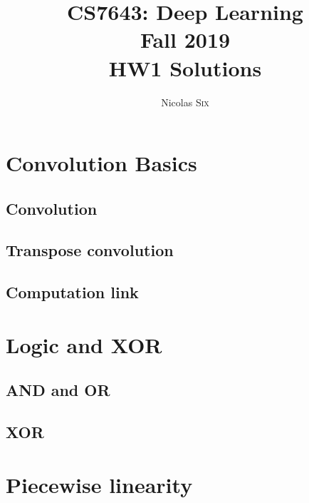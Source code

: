 \documentclass[11pt,english]{article}
\begin{document}
\title{CS7643: Deep Learning \\
Fall 2019\\ HW1 Solutions}
\author{Nicolas \textsc{Six}}
\maketitle



\section{Convolution Basics}

\subsection{Convolution} \label{1.1}


\subsection{Transpose convolution} \label{1.2}


\subsection{Computation link} \label{1.3}


\section{Logic and XOR}

    \subsection{AND and OR} \label{2.1}
    

    \subsection{XOR} \label{2.2}
    

\section{Piecewise linearity}
\end{document}
